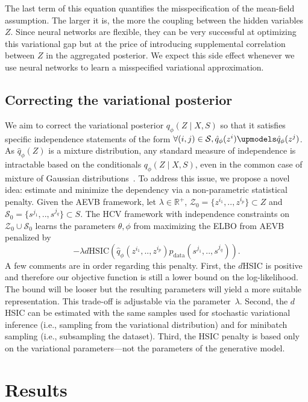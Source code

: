 The last term of this equation quantifies the misspecification of the mean-field assumption. The larger it is, the more the coupling between the hidden variables $Z$. Since neural networks are flexible, they can be very successful at optimizing this variational gap but at the price of introducing supplemental correlation between $Z$ in the aggregated posterior. We expect this side effect whenever we use neural networks to learn a misspecified variational approximation. 

\subsection{Correcting the variational posterior}
We aim to correct the variational posterior $q_\phi(Z \mid X, S)$ so that it satisfies specific independence statements of the form $\forall (i, j) \in \mathcal{S}, \hat{q}_\phi(z^i) \upmodels \hat{q}_\phi(z^j)$. As $\hat{q}_\phi(Z)$ is a mixture distribution, any standard measure of independence is intractable based on the conditionals $q_\phi(Z \mid X, S)$, even in the common case of mixture of Gaussian distributions~\cite{Durrieu2012}. To address this issue, we propose a novel idea: estimate and minimize the dependency via a non-parametric statistical penalty. Given the AEVB framework, let $\lambda \in \mathbb{R}^+$, $\mathcal{Z}_0 = \{z^{i_1}, .., z^{i_p}\} \subset Z$ and $\mathcal{S}_0 = \{s^{j_1}, .., s^{j_q}\} \subset S$. The HCV framework with independence constraints on $\mathcal{Z}_0\cup\mathcal{S}_0 $ learns the parameters $\theta, \phi$ from maximizing the ELBO from AEVB penalized by
\begin{equation} \label{hsicdhsic_penal}
-\lambda d\textrm{HSIC}(\hat{q}_\phi(z^{i_1}, .., z^{i_p})p_\text{data}(s^{j_1}, .., s^{j_q})).
\end{equation}
A few comments are in order regarding this penalty. First, the $d$HSIC is positive and therefore our objective function is still a lower bound on the log-likelihood. The bound will be looser but the resulting parameters will yield a more suitable representation. This trade-off is adjustable via the parameter~$\lambda$. Second, the $d$HSIC can be estimated with the same samples used for stochastic variational inference (i.e., sampling from the variational distribution) and for minibatch sampling (i.e., subsampling the dataset). Third, the HSIC penalty is based only on the variational parameters---not the parameters of the generative model.

\section{Results}